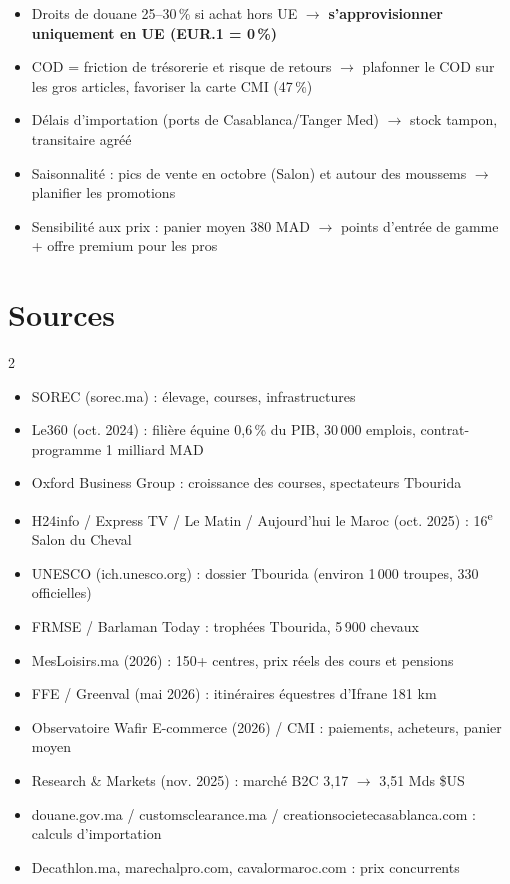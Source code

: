 \documentclass[11pt,a4paper]{article}
\begin{document}
\begin{warnbox}
\begin{itemize}
  \item Droits de douane 25--30\,\% si achat hors UE $\rightarrow$ \textbf{s'approvisionner uniquement en UE (EUR.1 = 0\,\%)}
  \item COD = friction de trésorerie et risque de retours $\rightarrow$ plafonner le COD sur les gros articles, favoriser la carte CMI (47\,\%)
  \item Délais d'importation (ports de Casablanca/Tanger Med) $\rightarrow$ stock tampon, transitaire agréé
  \item Saisonnalité : pics de vente en octobre (Salon) et autour des moussems $\rightarrow$ planifier les promotions
  \item Sensibilité aux prix : panier moyen 380 MAD $\rightarrow$ points d'entrée de gamme + offre premium pour les pros
\end{itemize}
\end{warnbox}

\section*{Sources}
{\footnotesize\color{graytext}
\begin{multicols}{2}
\raggedcolumns
\begin{itemize}
  \item SOREC (sorec.ma) : élevage, courses, infrastructures
  \item Le360 (oct. 2024) : filière équine 0,6\,\% du PIB, 30\,000 emplois, contrat-programme 1 milliard MAD
  \item Oxford Business Group : croissance des courses, spectateurs Tbourida
  \item H24info / Express TV / Le Matin / Aujourd'hui le Maroc (oct. 2025) : 16\textsuperscript{e} Salon du Cheval
  \item UNESCO (ich.unesco.org) : dossier Tbourida (environ 1\,000 troupes, 330 officielles)
  \item FRMSE / Barlaman Today : trophées Tbourida, 5\,900 chevaux
  \item MesLoisirs.ma (2026) : 150+ centres, prix réels des cours et pensions
  \item FFE / Greenval (mai 2026) : itinéraires équestres d'Ifrane 181 km
  \item Observatoire Wafir E-commerce (2026) / CMI : paiements, acheteurs, panier moyen
  \item Research \& Markets (nov. 2025) : marché B2C 3,17 $\rightarrow$ 3,51 Mds \$US
  \item douane.gov.ma / customsclearance.ma / creationsocietecasablanca.com : calculs d'importation
  \item Decathlon.ma, marechalpro.com, cavalormaroc.com : prix concurrents
\end{itemize}
\end{multicols}}
\end{document}
